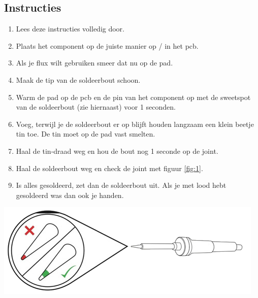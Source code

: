 \documentclass{guide}
\begin{document}
\subsection{Instructies}
\begin{minipage}{.60\textwidth}
  \begin{enumerate}
  \item Lees deze instructies volledig door.
  \item Plaats het component op de juiste manier op / in het pcb.
  \item Als je flux wilt gebruiken smeer dat nu op de pad.
  \item Maak de tip van de soldeerbout schoon.
  \item Warm de pad op de pcb en de pin van het component op met de sweetspot van de soldeerbout (zie hiernaast) voor 1 seconden.
  \item Voeg, terwijl je de soldeerbout er op blijft houden langzaam een klein beetje tin toe. De tin moet op de pad vast smelten.
  \item Haal de tin-draad weg en hou de bout nog 1 seconde op de joint.
  \item Haal de soldeerbout weg en check de joint met figuur \ref{fig:1}.
  \item Is alles gesoldeerd, zet dan de soldeerbout uit. Als je met lood hebt gesoldeerd was dan ook je handen.
  \end{enumerate}
\end{minipage}
\begin{minipage}{.40\textwidth}
  \includegraphics[width=\textwidth]{images/iron_hotspot.png}
  \label{wrap-fig:1}
\end{minipage}
\end{document}
